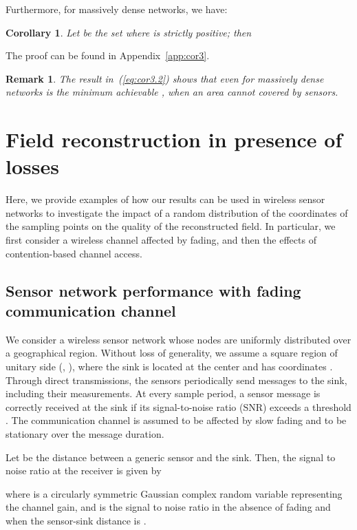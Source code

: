 \documentclass[11pt, draftcls, onecolumn, a4paper]{IEEEtran}
\newtheorem{corollary}{Corollary}[section]
\newtheorem{remark}{Remark}[section]
\begin{document}
Furthermore, for massively dense networks, we have:
\begin{corollary}
\label{cor3}
Let  be the set where  is strictly positive; then 

\end{corollary}
\begin{IEEEproof}
The proof can be found in Appendix~\ref{app:cor3}.
\end{IEEEproof}
\begin{remark}
The result in~(\ref{eq:cor3.2}) shows that even for massively dense
networks  is the minimum achievable , when an area
 cannot covered by sensors.
\end{remark}




\section{Field reconstruction in presence of losses\label{sec:applications}}


Here, we provide examples of how our results can be used in 
wireless sensor networks to 
investigate the impact of a random distribution of the coordinates
of the sampling points on the quality of the reconstructed field. 
In particular, we first consider a wireless channel 
affected by fading, and then  the effects of contention-based
channel access.



\subsection{Sensor network performance with fading communication channel}
We consider a wireless sensor network whose nodes are uniformly
distributed over a geographical region.  Without loss of generality,
we assume a square region of unitary side (,
), where the sink is located at the center and has
coordinates .  Through direct transmissions, the
sensors periodically send messages to the sink, including their
measurements.  At every sample period, a sensor message is correctly
received at the sink if its signal-to-noise ratio (SNR) exceeds a
threshold .  The communication channel is assumed to be affected
by slow fading and to be stationary over the message duration.

Let  be the distance between a generic sensor and the sink. Then, the signal
to noise ratio at the receiver is given by 

where  is a circularly symmetric
Gaussian complex random variable representing the channel gain, and
  is the signal to noise ratio in the absence of fading and
when the sensor-sink  distance is .
\end{document}
